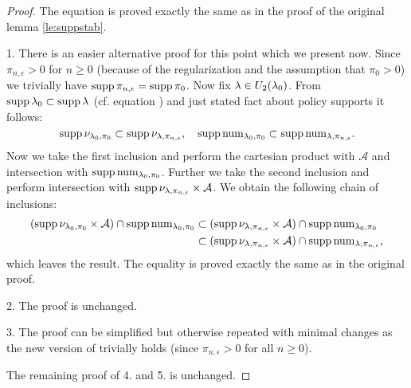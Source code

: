 \begin{proof}
The equation  is proved exactly the same as in the proof of the original lemma \ref{le:suppstab}.

1.
There is an easier alternative proof
for this point which we present now.
Since $\pi_{n,\epsilon} > 0$ for $n\geq 0$
(because of the regularization and the assumption that $\pi_0 > 0$) we
trivially have $\operatorname*{\mathrm{supp}} \pi_{n,\epsilon} = \operatorname*{\mathrm{supp}} \pi_0$.
Now fix $\mathit{\lambda} \in U_{2}(\mathit{\lambda}_0)$.
From $\operatorname*{\mathrm{supp}} \mathit{\lambda}_0 \subset \operatorname*{\mathrm{supp}} \mathit{\lambda}$ (cf. equation ) and just
stated fact about policy supports it follows:
\begin{equation}
\operatorname*{\mathrm{supp}} \nu_{\mathit{\lambda}_0,\pi_0} \subset
\operatorname*{\mathrm{supp}} \nu_{\mathit{\lambda},\pi_{n,\epsilon}},
\quad
\operatorname*{\mathrm{supp}} \mathrm{num}_{\mathit{\lambda}_0,\pi_0} \subset
\operatorname*{\mathrm{supp}} \mathrm{num}_{\mathit{\lambda},\pi_{n,\epsilon}}.
\end{equation}
Now we take the first inclusion and perform the cartesian product
with $\mathcal{A}$ and intersection with $\operatorname*{\mathrm{supp}} \mathrm{num}_{\mathit{\lambda}_0,\pi_0}$. Further we take the second inclusion
and perform intersection with $\operatorname*{\mathrm{supp}} \nu_{\mathit{\lambda},\pi_{n,\epsilon}} \times \mathcal{A}$.
We obtain the following chain of inclusions:
\begin{align*}
( \operatorname*{\mathrm{supp}} \nu_{\mathit{\lambda}_0,\pi_0}  \times \mathcal{A} )
\cap \operatorname*{\mathrm{supp}} \mathrm{num}_{\mathit{\lambda}_0,\pi_0}
&\subset
(\operatorname*{\mathrm{supp}} \nu_{\mathit{\lambda},\pi_{n,\epsilon}}  \times \mathcal{A} )
\cap \operatorname*{\mathrm{supp}} \mathrm{num}_{\mathit{\lambda}_0,\pi_0}
\\
&\subset
(\operatorname*{\mathrm{supp}} \nu_{\mathit{\lambda},\pi_{n,\epsilon}}  \times \mathcal{A} )
\cap \operatorname*{\mathrm{supp}} \mathrm{num}_{\mathit{\lambda},\pi_{n,\epsilon}},
\end{align*}
which leaves the result. The equality is proved exactly the same
as in the original proof.

2. The proof is unchanged.

3. The proof can be simplified but otherwise repeated with minimal changes as the new version of  trivially holds (since $\pi_{n,\epsilon}>0$ for all $n \geq 0$).

The remaining proof of 4. and 5. is unchanged.
\end{proof}


